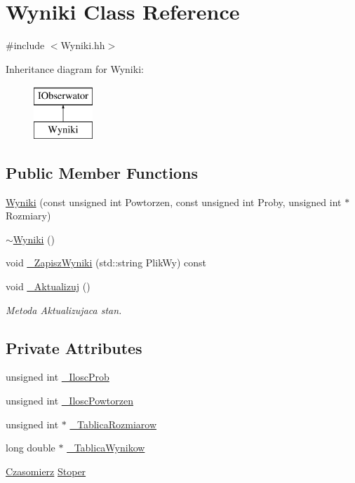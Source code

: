 \hypertarget{class_wyniki}{\section{Wyniki Class Reference}
\label{class_wyniki}
}


{\ttfamily \#include $<$Wyniki.\-hh$>$}

Inheritance diagram for Wyniki\-:\begin{figure}[H]
\begin{center}
\leavevmode
\includegraphics[height=2.000000cm]{class_wyniki}
\end{center}
\end{figure}
\subsection*{Public Member Functions}
\begin{DoxyCompactItemize}
\item 
\hyperlink{class_wyniki_a8d370dd59afbd516220a5abbfd5294be}{Wyniki} (const unsigned int Powtorzen, const unsigned int Proby, unsigned int $\ast$Rozmiary)
\item 
\hyperlink{class_wyniki_a0586d35f79012d9961cb4762567357c3}{$\sim$\-Wyniki} ()
\item 
void \hyperlink{class_wyniki_acc5e2bc728f9159a7e244339d84a47c6}{\-\_\-\-Zapisz\-Wyniki} (std\-::string Plik\-Wy) const 
\item 
void \hyperlink{class_wyniki_a4014236438f62cfd90c03de49ea38e5f}{\-\_\-\-Aktualizuj} ()
\begin{DoxyCompactList}\small\item\em Metoda Aktualizujaca stan. \end{DoxyCompactList}\end{DoxyCompactItemize}
\subsection*{Private Attributes}
\begin{DoxyCompactItemize}
\item 
unsigned int \hyperlink{class_wyniki_ac276b321edb9c38043e2b5aba213d847}{\-\_\-\-Ilosc\-Prob}
\item 
unsigned int \hyperlink{class_wyniki_ad207dabc5d9f03c957e1d023276f5548}{\-\_\-\-Ilosc\-Powtorzen}
\item 
unsigned int $\ast$ \hyperlink{class_wyniki_a559a3c3c4374708a493e8636320d9165}{\-\_\-\-Tablica\-Rozmiarow}
\item 
long double $\ast$ \hyperlink{class_wyniki_a6f47caedb424b964c117252febe1f135}{\-\_\-\-Tablica\-Wynikow}
\item 
\hyperlink{class_czasomierz}{Czasomierz} \hyperlink{class_wyniki_ac62ede680255427ef8f51e38e3eddcb9}{Stoper}
\end{DoxyCompactItemize}


